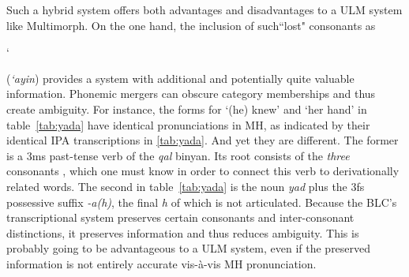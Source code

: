 Such a hybrid system offers both advantages and disadvantages to a 
\ac{ULM} system like Multimorph. 
On the one hand, the inclusion of such``lost" consonants as 
\begin{cjhebrew}`\end{cjhebrew} 
(\textit{`ayin}) provides a system with additional and potentially 
quite valuable information. 
Phonemic mergers can obscure category memberships and thus 
create ambiguity. For instance, 
the forms for `(he) knew' and `her hand' in  table~\ref{tab:yada}
have identical pronunciations in \ac{MH}, as indicated by their identical 
\ac{IPA} transcriptions
in \ref{tab:yada}. And yet they are different. 
The former is a 3ms past-tense verb of the 
\emph{qal} binyan. Its root consists of the \emph{three}
consonants \textit{}, which one must 
know in order 
to connect this verb to derivationally related words. 
The second \textipa{[yad\`{a}]} 
in table~\ref{tab:yada} is the noun \textit{yad} plus 
the 3fs possessive suffix 
\textit{-a(h)}, the final \emph{h} of which is not articulated. 
Because the \ac{BLC}'s transcriptional system preserves 
certain consonants and 
inter-consonant distinctions, it preserves information and 
thus reduces ambiguity. 
This is probably going to be advantageous to a \ac{ULM} 
system, even if the preserved 
information is not entirely accurate vis-\`{a}-vis \ac{MH} 
pronunciation.


